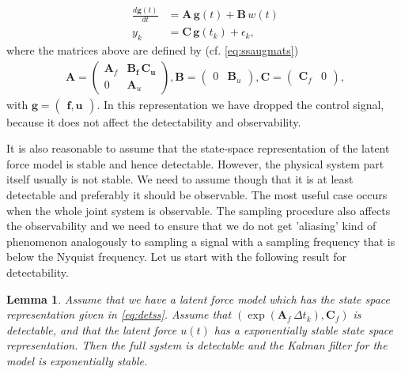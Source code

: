 \documentclass[journal]{IEEEtran}
\newtheorem{lemma}{Lemma}[section]
\begin{document}
\begin{equation}
\begin{split}
  \frac{d\mathbf{g}(t)}{dt}
  &= \mathbf{A} \, \mathbf{g}(t)
  + \mathbf{B} \, w(t) \\
  y_k &= \mathbf{C} \, \mathbf{g}(t_k) + \epsilon_k,
\end{split}
\label{eq:detss}
\end{equation}
%
where the matrices above are defined by (cf. \eqref{eq:ssaugmats})
%
\begin{equation}
\begin{split}
  \mathbf{A}
  = \begin{pmatrix}
	\mathbf{A}_f & \mathbf{\mathbf{B}_f \, \mathbf{C}_u} \\
	0 & \mathbf{A}_u
  \end{pmatrix}, 
  \mathbf{B}
  = \begin{pmatrix}
	0 & \mathbf{B}_u
  \end{pmatrix}, 
  \mathbf{C}
  = \begin{pmatrix}
	\mathbf{C}_f & 0
  \end{pmatrix},
\end{split}
\end{equation}
%
with $\mathbf{g} = \begin{pmatrix} \mathbf{f}, \mathbf{u} \end{pmatrix}$. In this representation we have dropped the control signal, because it does not affect the detectability and observability.

It is also reasonable to assume that the state-space representation of the latent force model is stable and hence detectable. However, the physical system part itself usually is not stable. We need to assume though that it is at least detectable and preferably it should be observable. The most useful case occurs when the whole joint system is observable. The sampling procedure also affects the observability and we need to ensure that we do not get 'aliasing' kind of phenomenon analogously to sampling a signal with a sampling frequency that is below the Nyquist frequency. Let us start with the following result for detectability.

\begin{lemma} \label{lem:detect}
  Assume that we have a latent force model which has the state space representation given in \eqref{eq:detss}.
Assume that $(\exp(\mathbf{A}_f \, \Delta t_k),\mathbf{C}_f)$ is detectable, and that the latent force $u(t)$ has a exponentially stable state space representation. Then the full system is \emph{detectable} and the Kalman filter for the model is exponentially stable.
\end{lemma}
\end{document}
